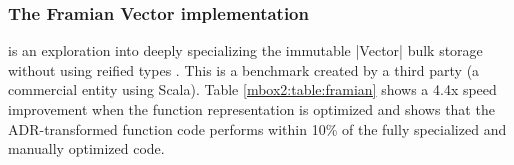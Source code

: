 \subsubsection*{The Framian Vector implementation} is an exploration into deeply specializing the immutable |Vector| bulk storage without using reified types \cite{tixxit-respecialization15,tixxit-respecialization6}. This is a benchmark created by a third party (a commercial entity using Scala). Table \ref{mbox2:table:framian} shows a 4.4x speed improvement when the function representation is optimized and shows that the ADR-transformed function code performs within 10\% of the fully specialized and manually optimized code. 
